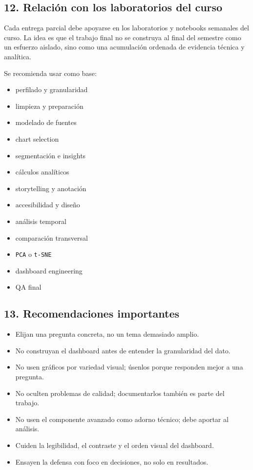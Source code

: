 \documentclass[
]{article}
\providecommand{\tightlist}{%
  \setlength{\itemsep}{0pt}\setlength{\parskip}{0pt}}
\begin{document}
\subsection{12. Relación con los laboratorios del
curso}\label{12-relaciuxf3n-con-los-laboratorios-del-curso}

Cada entrega parcial debe apoyarse en los laboratorios y notebooks
semanales del curso. La idea es que el trabajo final no se construya al
final del semestre como un esfuerzo aislado, sino como una acumulación
ordenada de evidencia técnica y analítica.

Se recomienda usar como base:

\begin{itemize}
\tightlist
\item
  perfilado y granularidad
\item
  limpieza y preparación
\item
  modelado de fuentes
\item
  chart selection
\item
  segmentación e insights
\item
  cálculos analíticos
\item
  storytelling y anotación
\item
  accesibilidad y diseño
\item
  análisis temporal
\item
  comparación transversal
\item
  \texttt{PCA} o \texttt{t-SNE}
\item
  dashboard engineering
\item
  QA final
\end{itemize}

\subsection{13. Recomendaciones
importantes}\label{13-recomendaciones-importantes}

\begin{itemize}
\tightlist
\item
  Elijan una pregunta concreta, no un tema demasiado amplio.
\item
  No construyan el dashboard antes de entender la granularidad del dato.
\item
  No usen gráficos por variedad visual; úsenlos porque responden mejor a
  una pregunta.
\item
  No oculten problemas de calidad; documentarlos también es parte del
  trabajo.
\item
  No usen el componente avanzado como adorno técnico; debe aportar al
  análisis.
\item
  Cuiden la legibilidad, el contraste y el orden visual del dashboard.
\item
  Ensayen la defensa con foco en decisiones, no solo en resultados.
\end{itemize}
\end{document}
